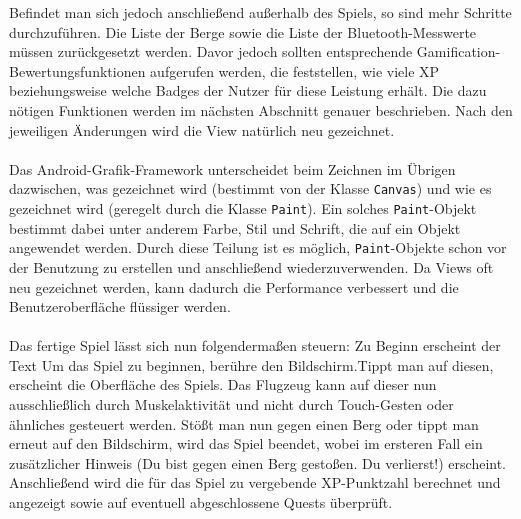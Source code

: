 Befindet man sich jedoch anschließend außerhalb des Spiels, so sind mehr Schritte durchzuführen. Die Liste der Berge sowie die Liste der Bluetooth-Messwerte müssen zurückgesetzt werden. Davor jedoch sollten entsprechende Gamification-Bewertungsfunktionen aufgerufen werden, die feststellen, wie viele XP beziehungsweise welche Badges der Nutzer für diese Leistung erhält. Die dazu nötigen Funktionen werden im nächsten Abschnitt genauer beschrieben. Nach den jeweiligen Änderungen wird die View natürlich neu gezeichnet. \\ \\
Das Android-Grafik-Framework unterscheidet beim Zeichnen im Übrigen dazwischen, was gezeichnet wird (bestimmt von der Klasse \texttt{Canvas}) und wie es gezeichnet wird (geregelt durch die Klasse \texttt{Paint}).\cite{Src:CustomView} Ein solches \texttt{Paint}-Objekt bestimmt dabei unter anderem Farbe, Stil und Schrift, die auf ein Objekt angewendet werden. Durch diese Teilung ist es möglich, \texttt{Paint}-Objekte schon vor der Benutzung zu erstellen und anschließend wiederzuverwenden. Da Views oft neu gezeichnet werden, kann dadurch die Performance verbessert und die Benutzeroberfläche flüssiger werden.\cite{Src:CustomView} \\ \\
Das fertige Spiel lässt sich nun folgendermaßen steuern: Zu Beginn erscheint der Text \glqq Um das Spiel zu beginnen, berühre den Bildschirm.\grqq Tippt man auf diesen, erscheint die Oberfläche des Spiels. Das Flugzeug kann auf dieser nun ausschließlich durch Muskelaktivität und nicht durch Touch-Gesten oder ähnliches gesteuert werden. Stößt man nun gegen einen Berg oder tippt man erneut auf den Bildschirm, wird das Spiel beendet, wobei im ersteren Fall ein zusätzlicher Hinweis (\glqq Du bist gegen einen Berg gestoßen. Du verlierst!\grqq) erscheint. Anschließend wird die für das Spiel zu vergebende XP-Punktzahl berechnet und angezeigt sowie auf eventuell abgeschlossene Quests überprüft.
